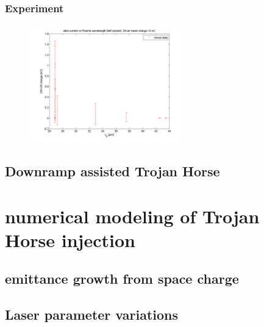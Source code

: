 \subsubsection{Experiment}
\begin{figure}
\begin{center}
\includegraphics[width=0.6\textwidth]{experiment/images/raw/DC_over_Lp_3nC_self20150518.png}
\end{center}
\end{figure}

	
\subsection{Downramp assisted Trojan Horse}

\section{numerical modeling of Trojan Horse injection}

\subsection{emittance growth from space charge}
\subsection{Laser parameter variations}
	
